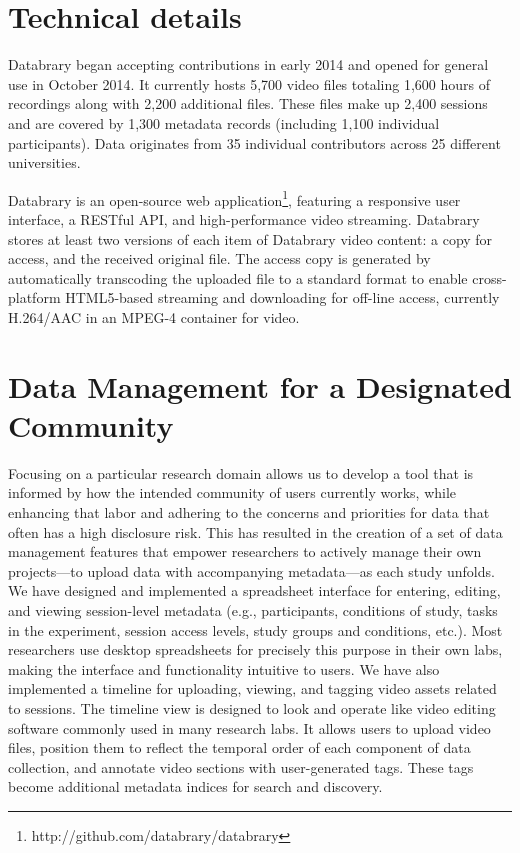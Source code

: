 \documentclass{sig-alternate}
\begin{document}
\section{Technical details}

Databrary began accepting contributions in early 2014 and opened for general use in October 2014.
It currently hosts 5,700 video files totaling 1,600 hours of recordings along with 2,200 additional files.
These files make up 2,400 sessions and are covered by 1,300 metadata records (including 1,100 individual participants).
Data originates from 35 individual contributors across 25 different universities.

Databrary is an open-source web application\footnote{http://github.com/databrary/databrary}, featuring a responsive user interface, a RESTful API, and high-performance video streaming.
Databrary stores at least two versions of each item of Databrary video content: a copy for access, and the received original file.
The access copy is generated by automatically transcoding the uploaded file to a standard format to enable cross-platform HTML5-based streaming and downloading for off-line access, currently H.264/AAC in an MPEG-4 container for video.

\section{Data Management for a Designated Community}

Focusing on a particular research domain allows us to develop a tool that is informed by how the intended community of users currently works, while enhancing that labor and adhering to the concerns and priorities for data that often has a high disclosure risk.
This has resulted in the creation of a set of data management features that empower researchers to actively manage their own projects---to upload data with accompanying metadata---as each study unfolds. 
We have designed and implemented a spreadsheet interface for entering, editing, and viewing session-level metadata (e.g., participants, conditions of study, tasks in the experiment, session access levels, study groups and conditions, etc.). 
Most researchers use desktop spreadsheets for precisely this purpose in their own labs, making the interface and functionality intuitive to users. 
We have also implemented a timeline for uploading, viewing, and tagging video assets related to sessions.
The timeline view is designed to look and operate like video editing software commonly used in many research labs.
It allows users to upload video files, position them to reflect the temporal order of each component of data collection, and annotate video sections with user-generated tags. 
These tags become additional metadata indices for search and discovery.
\end{document}
